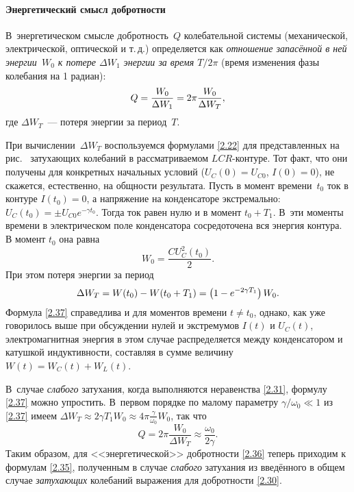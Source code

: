 \paragraph{Энергетический смысл добротности}
В~энергетическом смысле добротность~$Q$ колебательной системы
(механической, электрической, оптической и т.\,д.) определяется как 
\emph{отношение
запасённой в ней энергии~$W_0$ к потере $\Delta W_1$ энергии за время $T/2\pi$}
(время изменения фазы колебания на 1 радиан):
\begin{equation}\eqmark{2.36}
Q=\dfrac{W_0}{\Delta W_1}=2\pi\dfrac{W_0}{\Delta W_T},
\end{equation}
где  $\Delta W_T$~--- потеря энергии за период~$T$.

При вычислении~$\Delta W_T$
воспользуемся формулами \eqref{2.22} для представленных на рис.~
затухающих колебаний в рассматриваемом $LCR$-контуре. Тот факт, что
они получены для конкретных начальных условий ($U_C(0)=U_{C0}$, $I(0)=0$),
не скажется, естественно, на общности результата. Пусть в момент времени~$t_0$ ток
в контуре $I(t_0)=0$, а напряжение на конденсаторе экстремально: $U_C(t_0)=\pm
U_{C0}e^{-\gamma t_0}$. Тогда ток равен нулю и в момент $t_0+T_1$. В~эти моменты
времени в электрическом поле конденсатора сосредоточена вся энергия контура. 
В момент $t_0$ она равна
\begin{equation*}
W_0 = \frac{CU_C^2(t_0)}{2}.
\end{equation*}
При этом потеря энергии за период
\begin{equation}
	\eqmark{2.37}
			 \Delta W_T = W(t_0)-W(t_0+T_1)=\left(1-e^{-2\gamma T_1} \right)W_0.
\end{equation}
Формула \eqref{2.37} справедлива и для моментов времени $t\ne t_0$, однако, 
как уже говорилось выше при обсуждении нулей и экстремумов $I(t)$ и $U_C(t)$,
электромагнитная энергия в этом случае распределяется между конденсатором и
катушкой индуктивности, составляя в сумме величину~$W(t)=W_C(t)+W_L(t)$.

В~случае \emph{слабого} затухания, когда выполняются неравенства
\eqref{2.31}, формулу \eqref{2.37} можно упростить. В~первом порядке по малому
параметру $\gamma/\omega_0 \ll 1$
из \eqref{2.37} имеем 
$\Delta W_T \approx 2\gamma T_1 W_0 \approx 4\pi \frac{\gamma}{\omega_0} W_0$, так что
\begin{equation*}
Q = 2\pi \frac{W_0}{\Delta W_T} \approx \frac{\omega_0}{2\gamma}.
\end{equation*}
Таким образом, для <<энергетической>> добротности \eqref{2.36} теперь 
приходим к формулам \eqref{2.35}, полученным в случае \emph{слабого} 
затухания из введённого в общем случае \emph{затухающих} колебаний 
выражения для добротности \eqref{2.30}.

